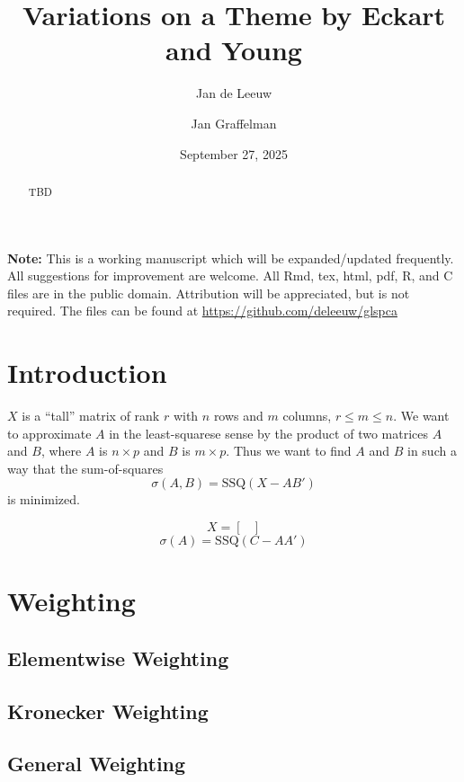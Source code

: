 \documentclass[
  12pt,
  letterpaper,
  DIV=11,
  numbers=noendperiod]{scrartcl}
\title{Variations on a Theme by Eckart and Young}
\author{Jan de Leeuw \and Jan Graffelman}
\date{September 27, 2025}
\newcommand{\sectionbreak}{\clearpage}
\renewcommand*\contentsname{Table of contents}
\newcommand\contentsname{Table of contents}
\begin{document}
\maketitle
\begin{abstract}
TBD
\end{abstract}

\renewcommand*\contentsname{Table of contents}
{
\hypersetup{linkcolor=}
\setcounter{tocdepth}{3}
\tableofcontents
}

\sectionbreak

\textbf{Note:} This is a working manuscript which will be
expanded/updated frequently. All suggestions for improvement are
welcome. All Rmd, tex, html, pdf, R, and C files are in the public
domain. Attribution will be appreciated, but is not required. The files
can be found at \url{https://github.com/deleeuw/glspca}

\sectionbreak

\section{Introduction}\label{introduction}

\(X\) is a ``tall'' matrix of rank \(r\) with \(n\) rows and \(m\)
columns, \(r\leq m\leq n\). We want to approximate \(A\) in the
least-squarese sense by the product of two matrices \(A\) and \(B\),
where \(A\) is \(n\times p\) and \(B\) is \(m\times p\). Thus we want to
find \(A\) and \(B\) in such a way that the sum-of-squares \[
\sigma(A,B)=\text{SSQ}(X-AB')
\] is minimized.

\[
X=
\begin{bmatrix}
\end{bmatrix}
\] \[
\sigma(A)=\text{SSQ}(C-AA')
\]

\section{Weighting}\label{weighting}

\subsection{Elementwise Weighting}\label{elementwise-weighting}

\subsection{Kronecker Weighting}\label{kronecker-weighting}

\subsection{General Weighting}\label{general-weighting}
\end{document}

